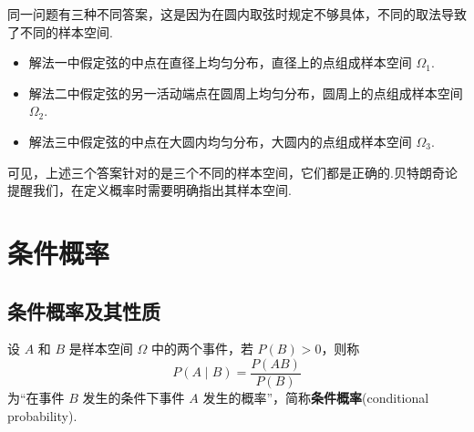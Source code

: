 \begin{note}
    \indent 同一问题有三种不同答案，这是因为在圆内取弦时规定不够具体，不同的取法导致了不同的样本空间.

    \begin{itemize}
        \item 解法一中假定弦的中点在直径上均匀分布，直径上的点组成样本空间 $\varOmega_1$.
        \item 解法二中假定弦的另一活动端点在圆周上均匀分布，圆周上的点组成样本空间 $\varOmega_2$.
        \item 解法三中假定弦的中点在大圆内均匀分布，大圆内的点组成样本空间 $\varOmega_3$.
    \end{itemize}

    可见，上述三个答案针对的是三个不同的样本空间，它们都是正确的.贝特朗奇论提醒我们，在定义概率时需要明确指出其样本空间.
\end{note}




\section{条件概率}

\subsection{条件概率及其性质}

\begin{definition}
    \indent 设 $A$ 和 $B$ 是样本空间 $\varOmega$ 中的两个事件，若 $P(B)>0$，则称
    $$
    P(A \mid B) = \dfrac{P(AB)}{P(B)}
    $$
    为“在事件 $B$ 发生的条件下事件 $A$ 发生的概率”，简称\textbf{条件概率}(conditional probability).
\end{definition}

